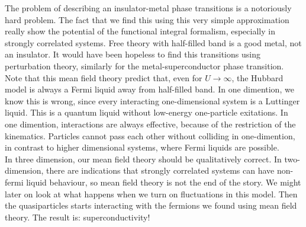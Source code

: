 The problem of describing an insulator-metal phase transitions is a notoriously hard problem. The fact that we find this using this very simple approximation really show the potential of the functional integral formalism, especially in strongly correlated systems. Free theory with half-filled band is a good metal, not an insulator. It would have been hopeless to find this transitions using perturbation theory, similarly for the metal-superconductor phase transition. Note that this mean field theory predict that, even for $U \to \infty$, the Hubbard model is always a Fermi liquid away from half-filled band. In one dimention, we know this is wrong, since every interacting one-dimensional system is a Luttinger liquid. This is a quantum liquid without low-energy one-particle exitations. In one dimention, interactions are always effective, because of the restriction of the kinematics. Particles cannot pass each other without colliding in one-dimention, in contrast to higher dimensional systems, where Fermi liquids are possible. \\

In three dimension, our mean field theory should be qualitatively correct. In two-dimension, there are indications that strongly correlated systems can have non-fermi liquid behaviour, so mean field theory is not the end of the story. We might later on look at what happens when we turn on fluctuations in this model. Then the quasiparticles starts interacting with the fermions we found using mean field theory. The result is: superconductivity! \\ 

